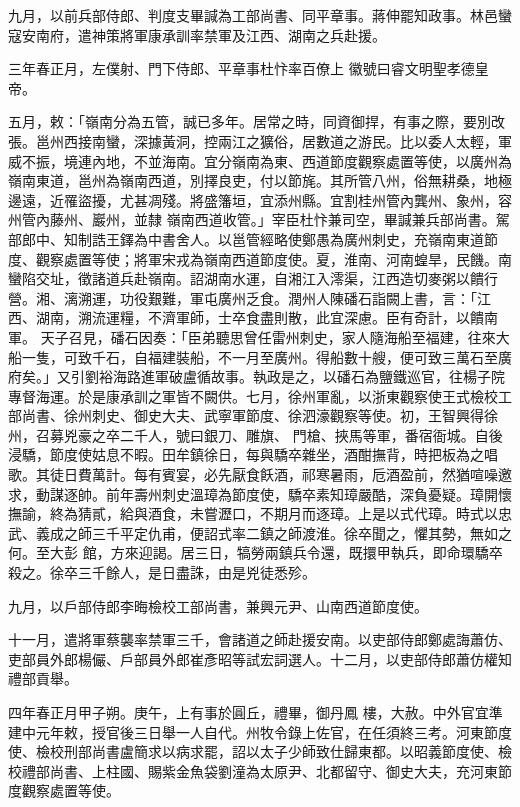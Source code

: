\begin{pinyinscope}
 九月，以前兵部侍郎、判度支畢諴為工部尚書、同平章事。蔣伸罷知政事。林邑蠻寇安南府，遣神策將軍康承訓率禁軍及江西、湖南之兵赴援。



 三年春正月，左僕射、門下侍郎、平章事杜忭率百僚上
 徽號曰睿文明聖孝德皇帝。



 五月，敕：「嶺南分為五管，誠已多年。居常之時，同資御捍，有事之際，要別改張。邕州西接南蠻，深據黃洞，控兩江之獷俗，居數道之游民。比以委人太輕，軍威不振，境連內地，不並海南。宜分嶺南為東、西道節度觀察處置等使，以廣州為嶺南東道，邕州為嶺南西道，別擇良吏，付以節旄。其所管八州，俗無耕桑，地極邊遠，近罹盜擾，尤甚凋殘。將盛籓垣，宜添州縣。宜割桂州管內龔州、象州，容州管內藤州、巖州，並隸
 嶺南西道收管。」宰臣杜忭兼司空，畢諴兼兵部尚書。駕部郎中、知制誥王鐸為中書舍人。以邕管經略使鄭愚為廣州刺史，充嶺南東道節度、觀察處置等使；將軍宋戎為嶺南西道節度使。夏，淮南、河南蝗旱，民饑。南蠻陷交址，徵諸道兵赴嶺南。詔湖南水運，自湘江入澪渠，江西造切麥粥以饋行營。湘、漓溯運，功役艱難，軍屯廣州乏食。潤州人陳磻石詣闕上書，言：「江西、湖南，溯流運糧，不濟軍師，士卒食盡則散，此宜深慮。臣有奇計，以饋南軍。
 天子召見，磻石因奏：「臣弟聽思曾任雷州刺史，家人隨海船至福建，往來大船一隻，可致千石，自福建裝船，不一月至廣州。得船數十艘，便可致三萬石至廣府矣。」又引劉裕海路進軍破盧循故事。執政是之，以磻石為鹽鐵巡官，往楊子院專督海運。於是康承訓之軍皆不闕供。七月，徐州軍亂，以浙東觀察使王式檢校工部尚書、徐州刺史、御史大夫、武寧軍節度、徐泗濠觀察等使。初，王智興得徐州，召募兇豪之卒二千人，號曰銀刀、雕旗、
 門槍、挾馬等軍，番宿衙城。自後浸驕，節度使姑息不暇。田牟鎮徐日，每與驕卒雜坐，酒酣撫背，時把板為之唱歌。其徒日費萬計。每有賓宴，必先厭食飫酒，祁寒暑雨，卮酒盈前，然猶喧噪邀求，動謀逐帥。前年壽州刺史溫璋為節度使，驕卒素知璋嚴酷，深負憂疑。璋開懷撫諭，終為猜貳，給與酒食，未嘗瀝口，不期月而逐璋。上是以式代璋。時式以忠武、義成之師三千平定仇甫，便詔式率二鎮之師渡淮。徐卒聞之，懼其勢，無如之何。至大彭
 館，方來迎謁。居三日，犒勞兩鎮兵令還，既擐甲執兵，即命環驕卒殺之。徐卒三千餘人，是日盡誅，由是兇徒悉殄。



 九月，以戶部侍郎李晦檢校工部尚書，兼興元尹、山南西道節度使。



 十一月，遣將軍蔡襲率禁軍三千，會諸道之師赴援安南。以吏部侍郎鄭處誨蕭仿、吏部員外郎楊儼、戶部員外郎崔彥昭等試宏詞選人。十二月，以吏部侍郎蕭仿權知禮部貢舉。



 四年春正月甲子朔。庚午，上有事於圓丘，禮畢，御丹鳳
 樓，大赦。中外官宜準建中元年敕，授官後三日舉一人自代。州牧令錄上佐官，在任須終三考。河東節度使、檢校刑部尚書盧簡求以病求罷，詔以太子少師致仕歸東都。以昭義節度使、檢校禮部尚書、上柱國、賜紫金魚袋劉潼為太原尹、北都留守、御史大夫，充河東節度觀察處置等使。




\end{pinyinscope}
